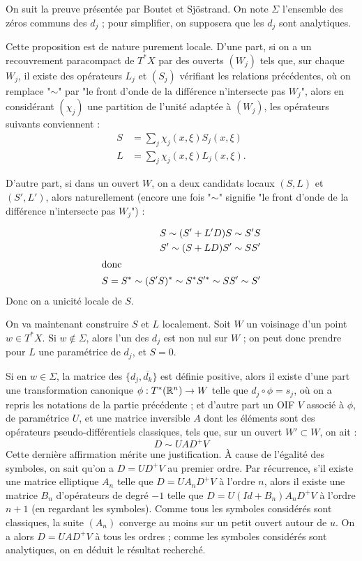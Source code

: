 \begin{preuve}
  On suit la preuve présentée par Boutet et Sjöstrand. On note $\Sigma$ l'ensemble des zéros communs des $d_j$ ; pour simplifier, on supposera que les $d_j$ sont analytiques.
  
  Cette proposition est de nature purement locale. D'une part, si on a un recouvrement paracompact de $T^*X$ par des ouverts $(W_j)$ tels que, sur chaque $W_j$, il existe des opérateurs $L_j$ et $(S_j)$ vérifiant les relations précédentes, où on remplace "$\sim$" par "le front d'onde de la différence n'intersecte pas $W_j$", alors en considérant $(\chi_j)$ une partition de l'unité adaptée à $(W_j)$, les opérateurs suivants conviennent :
  \begin{align*}
    S &= \sum_j \chi_j(x,\xi) S_j(x,\xi)\\
    L &= \sum_j \chi_j(x,\xi) L_j(x,\xi).
  \end{align*}

  D'autre part, si dans un ouvert $W$, on a deux candidats locaux $(S,L)$ et $(S',L')$, alors naturellement (encore une fois "$\sim$" signifie "le front d'onde de la différence n'intersecte pas $W_j$") :
  
  \begin{align*}
    S \sim (S'+L'D)S \sim S'S\\
    S' \sim (S+LD)S' \sim SS'\\
    \intertext{donc}
    S=S^* \sim (S'S)^* \sim S^*S'^* \sim SS' \sim S'
  \end{align*}
  Donc on a unicité locale de $S$.
  
  On va maintenant construire $S$ et $L$ localement. Soit $W$ un voisinage d'un point $w \in T^*X$. Si $w \notin \Sigma$, alors l'un des $d_j$ est non nul sur $W$ ; on peut donc prendre pour $L$ une paramétrice de $d_j$, et $S=0$.
  
  Si en $w\in \Sigma$, la matrice des $\{d_j,\overline{d_k}\}$ est définie positive, alors il existe d'une part une transformation canonique $\phi : T^*(\mathbb{R}^n) \to W$ telle que $d_j \circ \phi = s_j$, où on a repris les notations de la partie précédente ; et d'autre part un OIF $V$ associé à $\phi$, de paramétrice $U$, et une matrice inversible $A$ dont les éléments sont des opérateurs pseudo-différentiels classiques, tels que, sur un ouvert $W' \subset W$, on ait :
  \begin{equation*}
    D \sim UAD^+V
  \end{equation*}
  Cette dernière affirmation mérite une justification. À cause de l'égalité des symboles, on sait qu'on a $D=UD^+V$ au premier ordre. Par récurrence, s'il existe une matrice elliptique $A_n$ telle que $D=UA_nD^+V$ à l'ordre $n$, alors il existe une matrice $B_n$ d'opérateurs de degré $-1$ telle que $D=U(Id+B_n)A_nD^+V$ à l'ordre $n+1$ (en regardant les symboles). Comme tous les symboles considérés sont classiques, la suite $(A_n)$ converge au moins sur un petit ouvert autour de $u$. On a alors $D=UAD^+V$ à tous les ordres ; comme les symboles considérés sont analytiques, on en déduit le résultat recherché.
  

\end{preuve}
